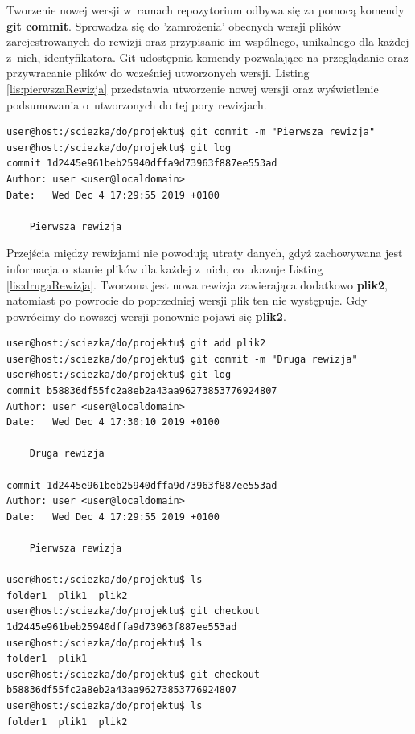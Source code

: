 Tworzenie nowej wersji w~ramach repozytorium odbywa się za pomocą komendy \textbf{git commit}. Sprowadza się do 'zamrożenia' obecnych wersji plików zarejestrowanych do rewizji oraz przypisanie im wspólnego, unikalnego dla każdej z~nich, identyfikatora. Git udostępnia komendy pozwalające na przeglądanie oraz przywracanie plików do wcześniej utworzonych wersji. Listing \ref{lis:pierwszaRewizja} przedstawia utworzenie nowej wersji oraz wyświetlenie podsumowania o~utworzonych do tej pory rewizjach.

\begin{lstlisting}[label={lis:pierwszaRewizja}, language=Cmd,caption={Utworzenie nowej rewizji}]
user@host:/sciezka/do/projektu$ git commit -m "Pierwsza rewizja"
user@host:/sciezka/do/projektu$ git log 
commit 1d2445e961beb25940dffa9d73963f887ee553ad
Author: user <user@localdomain>
Date:   Wed Dec 4 17:29:55 2019 +0100

    Pierwsza rewizja
\end{lstlisting}

Przejścia między rewizjami nie powodują utraty danych, gdyż zachowywana jest informacja o~stanie plików dla każdej z~nich, co ukazuje Listing \ref{lis:drugaRewizja}. Tworzona jest nowa rewizja zawierająca dodatkowo \textbf{plik2}, natomiast po powrocie do poprzedniej wersji plik ten nie występuje. Gdy powrócimy do nowszej wersji ponownie pojawi się \textbf{plik2}.

\begin{lstlisting}[language=Cmd,caption={Podsumowanie rewizji, powrót do starszej wersji},label={lis:drugaRewizja}]
user@host:/sciezka/do/projektu$ git add plik2
user@host:/sciezka/do/projektu$ git commit -m "Druga rewizja"
user@host:/sciezka/do/projektu$ git log 
commit b58836df55fc2a8eb2a43aa96273853776924807
Author: user <user@localdomain>
Date:   Wed Dec 4 17:30:10 2019 +0100

    Druga rewizja

commit 1d2445e961beb25940dffa9d73963f887ee553ad
Author: user <user@localdomain>
Date:   Wed Dec 4 17:29:55 2019 +0100

    Pierwsza rewizja

user@host:/sciezka/do/projektu$ ls
folder1  plik1  plik2
user@host:/sciezka/do/projektu$ git checkout 1d2445e961beb25940dffa9d73963f887ee553ad
user@host:/sciezka/do/projektu$ ls
folder1  plik1
user@host:/sciezka/do/projektu$ git checkout b58836df55fc2a8eb2a43aa96273853776924807
user@host:/sciezka/do/projektu$ ls
folder1  plik1  plik2
\end{lstlisting}

